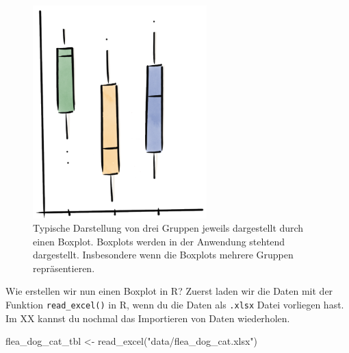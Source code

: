 \documentclass[
  letterpaper,
]{scrbook}
\newenvironment{Shaded}{\begin{snugshade}}{\end{snugshade}}
\newcommand{\FunctionTok}[1]{\textcolor[rgb]{0.28,0.35,0.67}{#1}}
\newcommand{\NormalTok}[1]{\textcolor[rgb]{0.00,0.23,0.31}{#1}}
\newcommand{\OtherTok}[1]{\textcolor[rgb]{0.00,0.23,0.31}{#1}}
\newcommand{\StringTok}[1]{\textcolor[rgb]{0.13,0.47,0.30}{#1}}
\begin{document}
\begin{figure}

{\centering \includegraphics[width=0.6\textwidth,height=\textheight]{./images/boxplot-drawn-flipped.png}

}

\caption{\label{fig-boxplot-drawn-flipped}Typische Darstellung von drei
Gruppen jeweils dargestellt durch einen Boxplot. Boxplots werden in der
Anwendung stehtend dargestellt. Insbesondere wenn die Boxplots mehrere
Gruppen repräsentieren.}

\end{figure}

Wie erstellen wir nun einen Boxplot in R? Zuerst laden wir die Daten mit
der Funktion \texttt{read\_excel()} in R, wenn du die Daten als
\texttt{.xlsx} Datei vorliegen hast. Im XX kannst du nochmal das
Importieren von Daten wiederholen.

\begin{Shaded}
\begin{Highlighting}[]
\NormalTok{flea\_dog\_cat\_tbl }\OtherTok{\textless{}{-}} \FunctionTok{read\_excel}\NormalTok{(}\StringTok{"data/flea\_dog\_cat.xlsx"}\NormalTok{)}
\end{Highlighting}
\end{Shaded}
\end{document}
